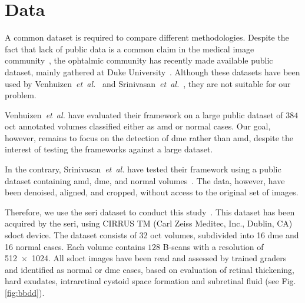 \graphicspath{ {./content/method/figures/} }

\section{Data}\label{sec:data}
A common dataset is required to compare different methodologies.
Despite the fact that lack of public data is a common claim in the medical image community~\cite{giger2008anniversary}, the ophtalmic community has recently made available public dataset, mainly gathered at Duke University~\cite{farsiu2014quantitative,Srinivasan2014}.
Although these datasets have been used by Venhuizen~\emph{et~al.}~\cite{Venhuizen2015} and Srinivasan~\emph{et~al.}~\cite{Srinivasan2014}, they are not suitable for our problem.

Venhuizen~\emph{et~al.} have evaluated their framework on a large public dataset of $384$ \gls{oct} annotated volumes classified either as \gls{amd} or normal cases.
Our goal, however, remains to focus on the detection of \gls{dme} rather than \gls{amd}, despite the interest of testing the frameworks against a large dataset.

In the contrary, Srinivasan~\emph{et~al.} have tested their framework using a public dataset containing \gls{amd}, \gls{dme}, and normal volumes~\cite{Srinivasan2014}.
The data, however, have been denoised, aligned, and cropped, without access to the original set of images.

Therefore, we use the \gls{seri} dataset to conduct this study~\cite{seri2016apr-repoICPR}.
This dataset has been acquired by the \gls{seri}, using CIRRUS TM (Carl Zeiss Meditec, Inc., Dublin, CA) \gls{sdoct} device.
The dataset consists of 32 \gls{oct} volumes, subdivided into 16 \gls{dme} and 16 normal cases.
Each volume contains $128$ B-scans with a resolution of \SI[product-units=repeat]{512x1024}{\px}.
All \gls{sdoct} images have been read and assessed by trained graders and identified as normal or \gls{dme} cases, based on evaluation of retinal thickening, hard exudates, intraretinal cystoid space formation and subretinal fluid (see Fig.\,\ref{fig:bbdd}).

